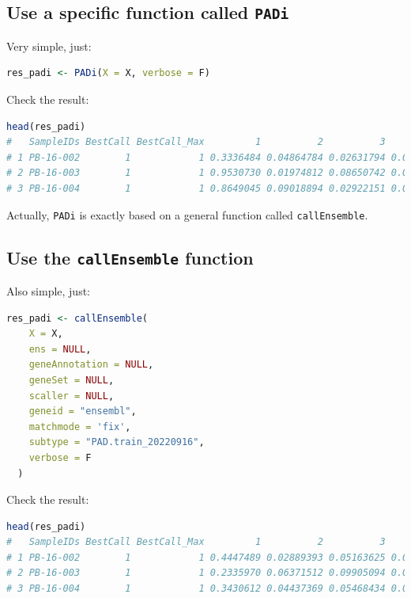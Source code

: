 \documentclass[
  12pt,
]{book}
\newcommand{\passthrough}[1]{#1}
\begin{document}
\hypertarget{use-a-specific-function-called-padi}{%
\subsection{\texorpdfstring{Use a specific function called \texttt{PADi}}{Use a specific function called PADi}}\label{use-a-specific-function-called-padi}}

Very simple, just:

\begin{lstlisting}[language=R]
res_padi <- PADi(X = X, verbose = F)
\end{lstlisting}

Check the result:

\begin{lstlisting}[language=R]
head(res_padi)
#   SampleIDs BestCall BestCall_Max         1          2          3           4
# 1 PB-16-002        1            1 0.3336484 0.04864784 0.02631794 0.023372779
# 2 PB-16-003        1            1 0.9530730 0.01974812 0.08650742 0.007271698
# 3 PB-16-004        1            1 0.8649045 0.09018894 0.02922151 0.011559768
\end{lstlisting}

Actually, \passthrough{\lstinline!PADi!} is exactly based on a general function called \passthrough{\lstinline!callEnsemble!}.

\hypertarget{use-the-callensemble-function}{%
\subsection{\texorpdfstring{Use the \texttt{callEnsemble} function}{Use the callEnsemble function}}\label{use-the-callensemble-function}}

Also simple, just:

\begin{lstlisting}[language=R]
res_padi <- callEnsemble(
    X = X,
    ens = NULL,
    geneAnnotation = NULL,
    geneSet = NULL,
    scaller = NULL,
    geneid = "ensembl",
    matchmode = 'fix',
    subtype = "PAD.train_20220916",
    verbose = F
  )
\end{lstlisting}

Check the result:

\begin{lstlisting}[language=R]
head(res_padi)
#   SampleIDs BestCall BestCall_Max         1          2          3          4
# 1 PB-16-002        1            1 0.4447489 0.02889393 0.05163625 0.01895758
# 2 PB-16-003        1            1 0.2335970 0.06371512 0.09905094 0.05834890
# 3 PB-16-004        1            1 0.3430612 0.04437369 0.05468434 0.02506850
\end{lstlisting}
\end{document}
